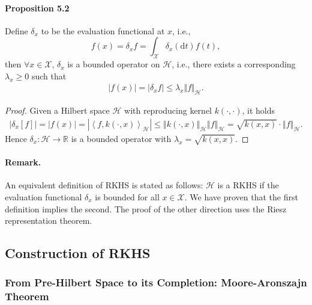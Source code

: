 \documentclass{article}
\begin{document}
\paragraph{Proposition 5.2} Define $\delta_x$ to be the evaluation functional at $x$, i.e.,
\begin{equation*}
	f(x) = \delta_xf = \int_\mathcal{X} \delta_x(\mathrm{d}t) f(t),\tag{5.2}
\end{equation*}
then $\forall x\in\mathcal{X}$, $\delta_x$ is a bounded operator on $\mathcal{H}$, i.e., there exists a corresponding $\lambda_x\geq 0$ such that
\begin{align*}
	\vert f(x)\vert = \left\vert\delta_xf\right\vert \leq \lambda_x\Vert f\Vert_{\mathcal{H}}.\tag{5.3}
\end{align*}
\begin{proof}
	Given a Hilbert space $\mathcal{H}$ with reproducing kernel $k(\cdot,\cdot)$, it holds
	\begin{align*}
		\left\vert \delta_x[f]\right\vert = \vert f(x)\vert = \left\vert\left\langle f,k(\cdot,x) \right\rangle_\mathcal{H}\right\vert \leq \left\Vert k(\cdot, x)\right\Vert_\mathcal{H}\left\Vert f \right\Vert_\mathcal{H} = \sqrt{k(x,x)}\cdot\left\Vert f \right\Vert_\mathcal{H}.\tag{5.4}
	\end{align*}
	Hence $\delta_x: \mathcal{H}\to\mathbb{R}$ is a bounded operator with $\lambda_x = \sqrt{k(x,x)}$.
\end{proof}

\paragraph{Remark.} An equivalent definition of RKHS is stated as follows: $\mathcal{H}$ is a RKHS if the evaluation functional $\delta_x$ is bounded for all $x\in\mathcal{X}$. We have proven that the first definition implies the second. The proof of the other direction uses the Riesz representation theorem.

\subsection{Construction of RKHS}
\subsubsection{From Pre-Hilbert Space to its Completion: Moore-Aronszajn Theorem}
\end{document}
